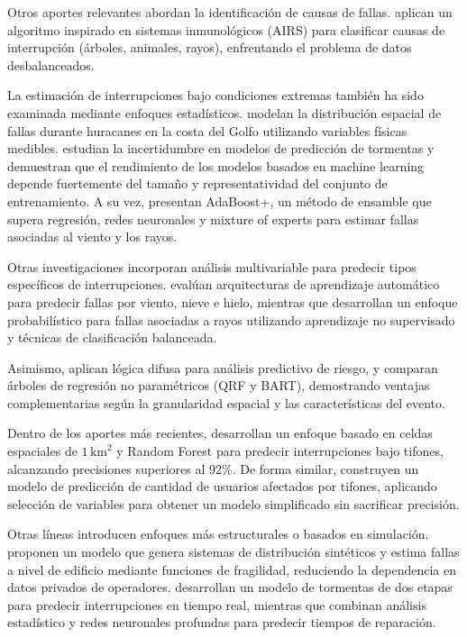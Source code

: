 Otros aportes relevantes abordan la identificación de causas de fallas. \textcite{ref18} aplican un algoritmo inspirado en sistemas inmunológicos (AIRS) para clasificar causas de interrupción (árboles, animales, rayos), enfrentando el problema de datos desbalanceados.

La estimación de interrupciones bajo condiciones extremas también ha sido examinada mediante enfoques estadísticos. \textcite{ref20} modelan la distribución espacial de fallas durante huracanes en la costa del Golfo utilizando variables físicas medibles. \textcite{ref21} estudian la incertidumbre en modelos de predicción de tormentas y demuestran que el rendimiento de los modelos basados en machine learning depende fuertemente del tamaño y representatividad del conjunto de entrenamiento. A su vez, \textcite{ref22} presentan AdaBoost+, un método de ensamble que supera regresión, redes neuronales y mixture of experts para estimar fallas asociadas al viento y los rayos.

Otras investigaciones incorporan análisis multivariable para predecir tipos específicos de interrupciones. \textcite{ref23} evalúan arquitecturas de aprendizaje automático para predecir fallas por viento, nieve e hielo, mientras que \textcite{ref24} desarrollan un enfoque probabilístico para fallas asociadas a rayos utilizando aprendizaje no supervisado y técnicas de clasificación balanceada.

Asimismo, \textcite{ref25} aplican lógica difusa para análisis predictivo de riesgo, y \textcite{ref26} comparan árboles de regresión no paramétricos (QRF y BART), demostrando ventajas complementarias según la granularidad espacial y las características del evento.

Dentro de los aportes más recientes, \textcite{ref27} desarrollan un enfoque basado en celdas espaciales de $1\,\text{km}^2$ y Random Forest para predecir interrupciones bajo tifones, alcanzando precisiones superiores al 92\%. De forma similar, \textcite{ref28} construyen un modelo de predicción de cantidad de usuarios afectados por tifones, aplicando selección de variables para obtener un modelo simplificado sin sacrificar precisión.

Otras líneas introducen enfoques más estructurales o basados en simulación. \textcite{ref29} proponen un modelo que genera sistemas de distribución sintéticos y estima fallas a nivel de edificio mediante funciones de fragilidad, reduciendo la dependencia en datos privados de operadores. \textcite{ref30} desarrollan un modelo de tormentas de dos etapas para predecir interrupciones en tiempo real, mientras que \textcite{ref31} combinan análisis estadístico y redes neuronales profundas para predecir tiempos de reparación.

